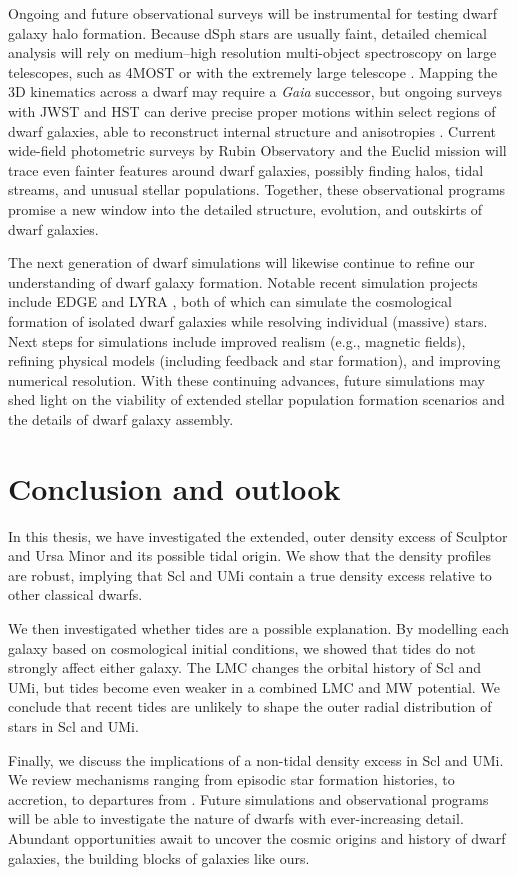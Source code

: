 Ongoing and future observational surveys will be instrumental for
testing dwarf galaxy halo formation. Because dSph stars are usually
faint, detailed chemical analysis will rely on medium--high resolution
multi-object spectroscopy on large telescopes, such as 4MOST
\citep{skuladottir+2023} or with the extremely large telescope
\citep{jagourel+2018}. Mapping the 3D kinematics across a dwarf may
require a \emph{Gaia} successor, but ongoing surveys with JWST and HST
can derive precise proper motions within select regions of dwarf
galaxies, able to reconstruct internal structure and anisotropies
\citep[e.g.,][]{vitral+2025}. Current wide-field photometric surveys by
Rubin Observatory \citep{ivezic+2019} and the Euclid mission
\citep{euclidcollaboration+2025} will trace even fainter features around
dwarf galaxies, possibly finding halos, tidal streams, and unusual
stellar populations. Together, these observational programs promise a
new window into the detailed structure, evolution, and outskirts of
dwarf galaxies.

The next generation of dwarf simulations will likewise continue to
refine our understanding of dwarf galaxy formation. Notable recent
simulation projects include EDGE \citep{agertz+2020} and LYRA
\citep{gutcke+2021}, both of which can simulate the cosmological
formation of isolated dwarf galaxies while resolving individual
(massive) stars. Next steps for simulations include improved realism
(e.g., magnetic fields), refining physical models (including feedback
and star formation), and improving numerical resolution. With these
continuing advances, future simulations may shed light on the viability
of extended stellar population formation scenarios and the details of
dwarf galaxy assembly.

\section{Conclusion and outlook}\label{conclusion-and-outlook}

In this thesis, we have investigated the extended, outer density excess
of Sculptor and Ursa Minor and its possible tidal origin. We show that
the density profiles are robust, implying that Scl and UMi contain a
true density excess relative to other classical dwarfs.

We then investigated whether tides are a possible explanation. By
modelling each galaxy based on cosmological initial conditions, we
showed that tides do not strongly affect either galaxy. The LMC changes
the orbital history of Scl and UMi, but tides become even weaker in a
combined LMC and MW potential. We conclude that recent tides are
unlikely to shape the outer radial distribution of stars in Scl and UMi.

Finally, we discuss the implications of a non-tidal density excess in
Scl and UMi. We review mechanisms ranging from episodic star formation
histories, to accretion, to departures from \LCDM{}. Future simulations
and observational programs will be able to investigate the nature of
dwarfs with ever-increasing detail. Abundant opportunities await to
uncover the cosmic origins and history of dwarf galaxies, the building
blocks of galaxies like ours.

